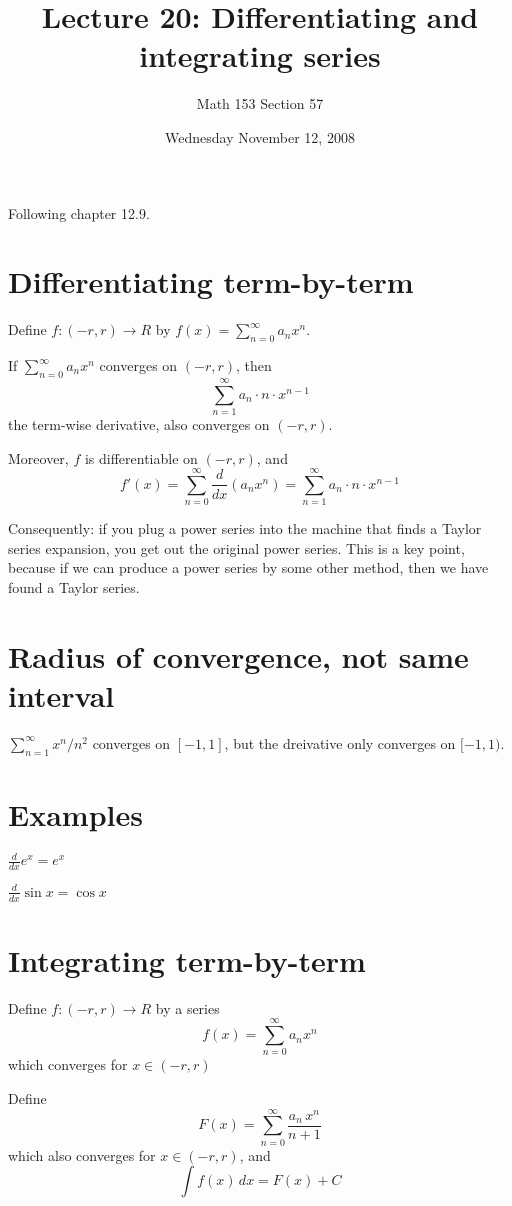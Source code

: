 \documentclass[12pt]{article}
\title{Lecture 20: Differentiating and integrating series}
\author{Math 153 Section 57}
\date{Wednesday November 12, 2008}
\begin{document}
\maketitle

Following chapter 12.9.

\section{Differentiating term-by-term}

Define $f : (-r,r) \to R$ by $f(x) = \sum_{n=0}^\infty a_n x^n$.

If $\sum_{n=0}^\infty a_n x^n$ converges on $(-r,r)$, then
$$
\sum_{n=1}^\infty a_n \cdot n \cdot x^{n-1}
$$
the term-wise derivative, also converges on $(-r,r)$.

Moreover, $f$ is differentiable on $(-r,r)$, and
$$
f'(x) = \sum_{n=0}^\infty \frac{d}{dx} \left( a_n x^n \right) = \sum_{n=1}^\infty a_n \cdot n \cdot x^{n-1}
$$

Consequently: if you plug a power series into the machine that finds a
Taylor series expansion, you get out the original power series.  This
is a key point, because if we can produce a power series by some other
method, then we have found a Taylor series.

\section{Radius of convergence, not same interval}

$\sum_{n=1}^\infty x^n/n^2$ converges on $[-1,1]$, but the dreivative only converges on $[-1,1)$.

\section{Examples}

$\frac{d}{dx} e^x = e^x$

$\frac{d}{dx} \sin x = \cos x$

\section{Integrating term-by-term}

Define $f : (-r,r) \to R$ by a series
$$
f(x) = \sum_{n=0}^\infty a_n x^n
$$
which converges for $x \in (-r,r)$

Define
$$
F(x) = \sum_{n=0}^\infty \frac{a_n \, x^n}{n+1}
$$
which also converges for $x \in (-r,r)$, and 
$$
\int f(x) \, dx = F(x) + C
$$
\end{document}
